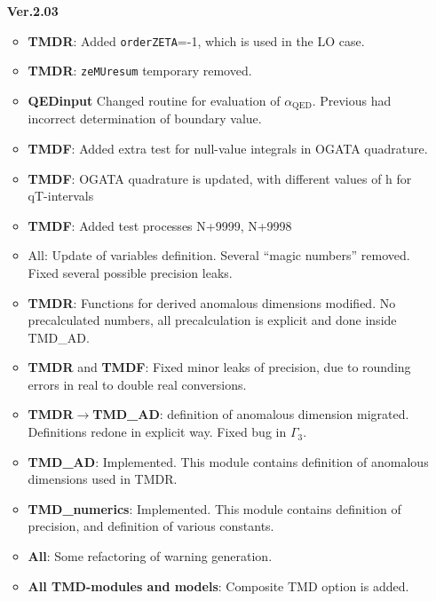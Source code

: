 \documentclass[prd,nofootinbib,eqsecnum,final]{revtex4}
\renewcommand{\(}{\left(}
\renewcommand{\)}{\right)}
\renewcommand{\[}{\left[}
\renewcommand{\]}{\right]}
\newcommand{\red}[1]{{\color[rgb]{1,0,0} #1}}
\begin{document}
\begin{itemize}
\item[\textbf{Ver.2.03}]
\begin{itemize}	
	\item \textbf{TMDR}: Added \texttt{orderZETA}=-1, which is used in the LO case.
 	\item \textbf{TMDR}: \texttt{zeMUresum} temporary removed.
	\item \textbf{QEDinput} \red{Changed routine for evaluation of $\alpha_{\text{QED}}$. Previous had incorrect determination of boundary value.}
	\item \textbf{TMDF}: Added extra test for null-value integrals in OGATA quadrature.
	\item \textbf{TMDF}: OGATA quadrature is updated, with different values of h for qT-intervals
	\item \textbf{TMDF}: Added test processes N+9999, N+9998
	\item {All}: Update of variables definition. Several ``magic numbers'' removed. Fixed several possible precision leaks.
	\item \textbf{TMDR}: Functions for derived anomalous dimensions modified. No precalculated numbers, all precalculation is explicit and done inside TMD\_AD.
	\item \textbf{TMDR} and \textbf{TMDF}: Fixed minor leaks of precision, due to rounding errors in real to double real conversions.
	\item \textbf{TMDR}$\to$\textbf{TMD\_AD}: definition of anomalous dimension migrated. Definitions redone in explicit way. Fixed bug in $\Gamma_3$.
	\item \textbf{TMD\_AD}: Implemented. This module contains definition of anomalous dimensions used in TMDR.
	\item \textbf{TMD\_numerics}: Implemented. This module contains definition of precision, and definition of various constants.
	\item \textbf{All}: Some refactoring of warning generation.
	\item \textbf{All TMD-modules and models}: Composite TMD option is added.
\end{itemize}


\end{itemize}
\end{document}
